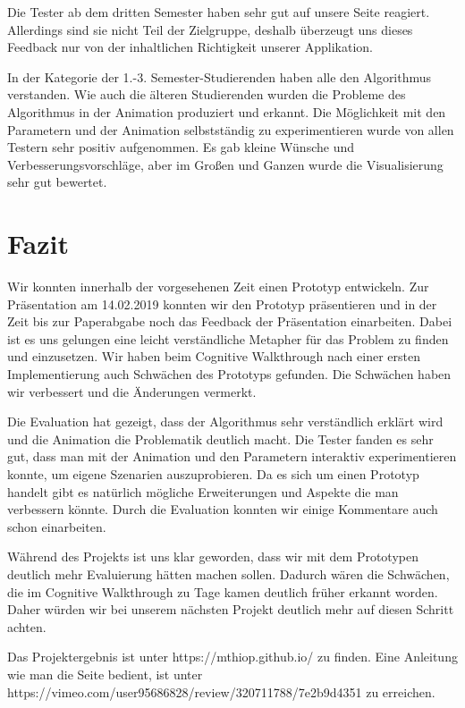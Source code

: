 
Die Tester ab dem dritten Semester haben sehr gut auf unsere Seite reagiert. Allerdings sind sie nicht Teil der Zielgruppe, deshalb überzeugt uns dieses Feedback nur von der inhaltlichen Richtigkeit unserer Applikation. 

In der Kategorie der 1.-3. Semester-Studierenden haben alle den Algorithmus verstanden. Wie auch die älteren Studierenden wurden die Probleme des Algorithmus in der Animation produziert und erkannt. Die Möglichkeit mit den Parametern und der Animation selbstständig zu experimentieren wurde von allen Testern sehr positiv aufgenommen. Es gab kleine Wünsche und Verbesserungsvorschläge, aber im Großen und Ganzen wurde die Visualisierung sehr gut bewertet.


\section{Fazit}
Wir konnten innerhalb der vorgesehenen Zeit einen Prototyp entwickeln.
Zur Präsentation am 14.02.2019 konnten wir den Prototyp präsentieren und in der Zeit bis zur Paperabgabe noch das Feedback der Präsentation einarbeiten.
Dabei ist es uns gelungen eine leicht verständliche Metapher für das Problem zu finden und einzusetzen. 
Wir haben beim Cognitive Walkthrough nach einer ersten Implementierung auch Schwächen des Prototyps gefunden. 
Die Schwächen haben wir verbessert und die Änderungen vermerkt.

Die Evaluation hat gezeigt, dass der Algorithmus sehr verständlich erklärt wird und die Animation die Problematik deutlich macht. Die Tester fanden es sehr gut, dass man mit der Animation und den Parametern interaktiv experimentieren konnte, um eigene Szenarien auszuprobieren. 
Da es sich um einen Prototyp handelt gibt es natürlich mögliche Erweiterungen und  Aspekte die man verbessern könnte. Durch die Evaluation konnten wir einige Kommentare auch schon einarbeiten. 


Während des Projekts ist uns klar geworden, dass wir mit dem Prototypen deutlich mehr Evaluierung hätten machen sollen. 
Dadurch wären die Schwächen, die im Cognitive Walkthrough zu Tage kamen deutlich früher erkannt worden.
Daher würden wir bei unserem nächsten Projekt deutlich mehr auf diesen Schritt achten.



Das Projektergebnis ist unter https://mthiop.github.io/ zu finden. Eine Anleitung wie man die Seite bedient, ist unter https://vimeo.com/user95686828/review/320711788/7e2b9d4351 zu erreichen.